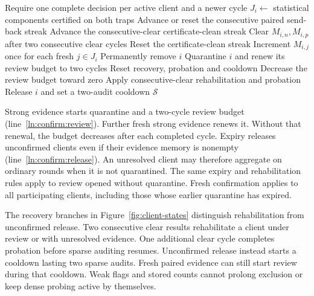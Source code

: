 \documentclass[conference]{IEEEtran}
\begin{document}
\begin{algorithm}[!htb]
\caption{Phase III: confirm evidence and bound review}\label{alg:confirmation}
\begin{algorithmic}[1]\small
{}
 \State Require one complete decision per active client and a newer cycle
  \State $J_i\gets$ statistical components certified on both traps
  \State Advance or reset the consecutive paired send-back streak
   \State Advance the consecutive-clear certificate-clean streak
   \State Clear $M_{i,n},M_{i,p}$ after two consecutive clear cycles
  \Else
   \State Reset the certificate-clean streak
   \State Increment $M_{i,j}$ once for each fresh $j\in J_i$\label{ln:confirm:increment}
  \EndIf
   \State Permanently remove $i$\label{ln:confirm:remove}
   \State Quarantine $i$ and renew its review budget to two cycles\label{ln:confirm:review}
   \State Reset recovery, probation and cooldown
  \Else
   \State Decrease the review budget toward zero
   \State Apply consecutive-clear rehabilitation and probation
    \State Release $i$ and set a two-audit cooldown\label{ln:confirm:release}
   \EndIf
  \EndIf
 \EndFor
 \State \Return $\mathcal S$
\EndProcedure
\end{algorithmic}
\end{algorithm}

Strong evidence starts quarantine and a two-cycle review budget
(line~\ref{ln:confirm:review}). Further fresh strong evidence renews it.
Without that renewal, the budget decreases after each completed cycle.
Expiry releases unconfirmed clients even if their evidence memory is
nonempty (line~\ref{ln:confirm:release}). An unresolved client may
therefore aggregate on ordinary rounds when it is not quarantined.
The same expiry and rehabilitation rules apply to review opened without
quarantine. Fresh confirmation applies to all participating clients,
including those whose earlier quarantine has expired.

The recovery branches in Figure~\ref{fig:client-states} distinguish
rehabilitation from unconfirmed release. Two consecutive clear results
rehabilitate a client under review or with unresolved evidence. One
additional clear cycle completes probation before sparse auditing resumes.
Unconfirmed release instead starts a cooldown lasting two sparse audits.
Fresh paired evidence can still start review during
that cooldown. Weak flags and stored counts cannot prolong exclusion
or keep dense probing active by themselves.
\end{document}

